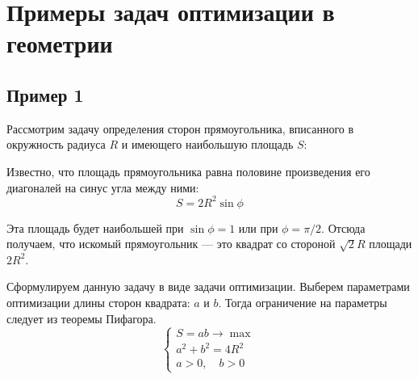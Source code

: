 \documentclass[17pt]{extarticle}
\begin{document}
\section{Примеры задач оптимизации в геометрии}

\subsection{Пример 1}
Рассмотрим задачу определения сторон прямоугольника, вписанного в окружность радиуса \( R \) и имеющего наибольшую площадь \( S \):


Известно, что площадь прямоугольника равна половине произведения его диагоналей на синус угла между ними:
\[
    S = 2 R^2 \sin{\phi}
\]

Эта площадь будет наибольшей при \( \sin{\phi} = 1 \) или при \( \phi = \pi / 2 \). Отсюда получаем, что искомый прямоугольник — это квадрат со стороной \( \sqrt{2} R \) площади \( 2 R^2 \).

Сформулируем данную задачу в виде задачи оптимизации. Выберем параметрами оптимизации длины сторон квадрата: \( a \) и \( b \). Тогда ограничение на параметры следует из теоремы Пифагора.
\[
    \begin{cases}
        S = a b \to \max  \\
        a^2 + b^2 = 4 R^2 \\
        a > 0, \quad b > 0
    \end{cases}
\]
\end{document}
